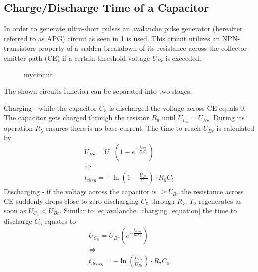     \subsection{Charge/Discharge Time of a Capacitor}\label{sec:A3_charge-discharge-time}
        In order to generate ultra-short pulses an avalanche pulse generator (hereafter referred to as APG) circuit as seen in \cref{fig:avalanche_pulse_generator_circuit}
        is used. This circuit utilizes an NPN-transistors property of a sudden breakdown of its resistance across the collector-emitter path (CE)
        if a certain threshold voltage \( U_{Br} \) is exceeded.\par
        \begin{figure}[h]
            \centering
            
            \caption{mycircuit}
            \label{fig:avalanche_pulse_generator_circuit}
        \end{figure}
        The shown circuits function can be separated into two stages:\par
        Charging - while the capacitor \( C_5 \) is discharged the voltage across CE equals 0. The capacitor gets charged
        through the resistor \( R_6 \) until \( U_{C_5} = U_{Br}\). During its operation \( R_5 \) ensures there is no
        base-current. The time to reach \( U_{Br} \) is calculated by
        \begin{gather}
            U_{Br} = U_+ \left( 1 - e^{-\frac{t_{chrg}}{R_6C_5}}\right) \nonumber \\
            \Leftrightarrow \nonumber \\
            t_{chrg} = - \ln\left(1 - \frac{U_{Br}}{U_+}\right) \cdot R_6 C_5
            \label{eq:avalanche_charging_equation}
        \end{gather}
        Discharging - if the voltage across the capacitor is \( \geq U_{Br} \) the resistance across CE suddenly drops close
        to zero discharging \( C_5 \) through \( R_7 \). \( T_2 \) regenerates as soon as \( U_{C_5} < U_{Br} \). Similar to \cref{eq:avalanche_charging_equation}
        the time to discharge \( C_5 \) equates to
        \begin{gather}
            U_{C_5} = U_{Br} \left(e^{-\frac{t_{dchrg}}{R_7C_5}}\right) \nonumber \\
            \Leftrightarrow \nonumber \\
            t_{dchrg} = -\ln\left( \frac{U_{C_5}}{U_{Br}} \right) \cdot R_7 C_5
            \label{eq:avalanche_discharging_equation}
        \end{gather}
